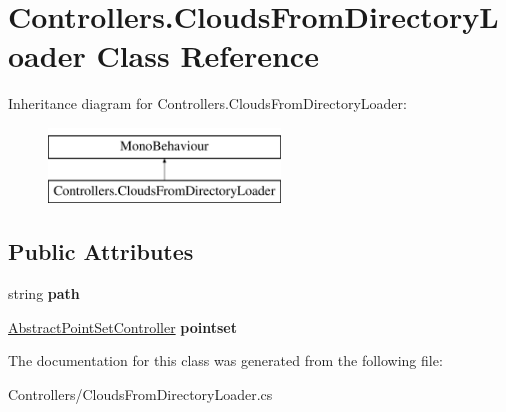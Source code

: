 \hypertarget{class_controllers_1_1_clouds_from_directory_loader}{}\section{Controllers.\+Clouds\+From\+Directory\+Loader Class Reference}
\label{class_controllers_1_1_clouds_from_directory_loader}
Inheritance diagram for Controllers.\+Clouds\+From\+Directory\+Loader\+:\begin{figure}[H]
\begin{center}
\leavevmode
\includegraphics[height=2.000000cm]{class_controllers_1_1_clouds_from_directory_loader}
\end{center}
\end{figure}
\subsection*{Public Attributes}
\begin{DoxyCompactItemize}
\item 
\mbox{\label{class_controllers_1_1_clouds_from_directory_loader_a51d5ebe509e8dd85161489c163bebe42}} 
string {\bfseries path}
\item 
\mbox{\label{class_controllers_1_1_clouds_from_directory_loader_ae8b5d29d07e3e737498199a90c43e8f6}} 
\hyperlink{class_controllers_1_1_abstract_point_set_controller}{Abstract\+Point\+Set\+Controller} {\bfseries pointset}
\end{DoxyCompactItemize}


The documentation for this class was generated from the following file\+:\begin{DoxyCompactItemize}
\item 
Controllers/Clouds\+From\+Directory\+Loader.\+cs\end{DoxyCompactItemize}
